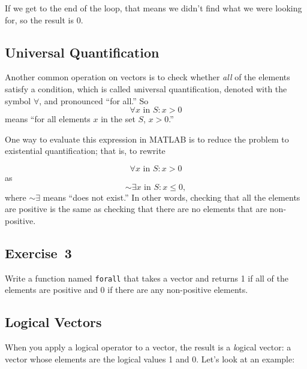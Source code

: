 
If we get to the end of the loop, that means we didn't find what
we were looking for, so the result is 0.

\subsection{Universal Quantification}


Another common operation on vectors is to check whether {\em all}
of the elements satisfy a condition, which is called {\emph universal quantification}, denoted with
the symbol $\forall$, and pronounced ``for all.''  So %
%
\[ \forall x \mbox{~in~} S: x>0 \]
%
means ``for all elements $x$ in the set $S$, $x>0$.''

One way to evaluate this expression in MATLAB is to reduce the problem to
existential quantification; that is, to rewrite

\begin{equation*}
\forall x \mbox{~in~} S: x>0
\end{equation*}
as
\begin{equation*}
{\sim} \exists x \mbox{~in~} S: x \le 0 ,
\end{equation*}
where ${\sim} \exists$ means ``does not exist.''
In other words, checking that all the elements are positive is
the same as checking that there are no elements
that are non-positive.

\subsection{Exercise~3}
Write a function named \lstinline{forall} that
takes a vector and returns 1 if all of the elements are positive
and 0 if there are any non-positive elements.





\subsection{Logical Vectors}

When you apply a logical operator to a vector, the result is a 
{\emph logical vector}: a vector whose elements are the logical
values 1 and 0. Let's look at an example:

